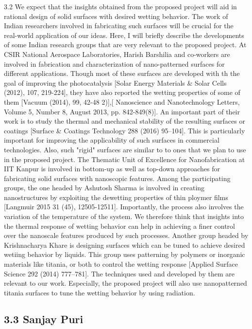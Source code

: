 \par 3.2 We expect that the insights obtained from the proposed project will aid in rational design of solid surfaces with desired wetting behavior. The work of Indian researchers involved in fabricating such surfaces will be crucial for the real-world application of our ideas. Here, I will briefly describe the developments of some Indian research groups that are very relevant to the proposed project. At CSIR National Aerospace Laboratories, Harish Barshilia and co-workers are involved in fabrication and characterization of nano-patterned surfaces for different applications. Though most of these surfaces are developed with th the goal of improving the photocatalysis [Solar Energy Materials \& Solar Cells (2012), 107, 219-224], they have also reported the wetting properties of some of them [Vacuum (2014), 99, 42-48 2)],[ Nanoscience and Nanotechnology Letters, Volume 5, Number 8, August 2013, pp. 842-849(8)]. An important part of their work is to study the thermal and mechanical stability of the resulting surfaces or coatings [Surface \& Coatings Technology 288 (2016) 95–104]. This is particularly important for improving the applicability of such surfaces in commercial technologies. Also, such "rigid" surfaces are similar to to ones that we plan to use in the proposed project. The Thematic Unit of Excellence for Nanofabrication at IIT Kanpur is involved in bottom-up as well as top-down approaches for fabricating solid surfaces with nanoscopic features. Among the participating groups, the one headed by Ashutosh Sharma is involved in creating nanostructures by exploiting the dewetting properties of thin ploymer films [Langmuir 2015 31 (45), 12505-12511]. Importantly, the process also involves the variation of the temperature of the system. We therefore think that insights into the thermal response of wetting behavior can help in achieving a finer control over the nanoscale features produced by such processes. Another group headed by Krishnacharya Khare is designing surfaces which can be tuned to achieve desired wetiing behavior by liquids. This group uses patterning by polymers or inorganic materials like titania, or both to control the wetting response [Applied Surface Science 292 (2014) 777–781]. The techniques used and developed by them are relevant to our work. Especially, the proposed project will also use nanopatterned titania surfaces to tune the wetting behavior by using radiation.\subsection{3.3 Sanjay Puri}

